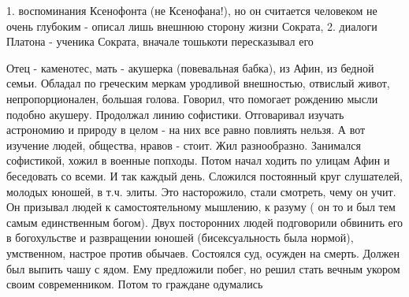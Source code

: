 	1. воспоминания Ксенофонта (не Ксенофана!), но он считается человеком не очень глубоким - описал лишь внешнюю сторону жизни Сократа,
	2. диалоги Платона - ученика Сократа, вначале тошькоти пересказывал его

Отец - каменотес, мать - акушерка (повевальная бабка), из Афин, из бедной семьи. Обладал по греческим меркам уродливой внешностью, отвислый живот, непропорционален, большая голова. 
Говорил, что помогает рождению мысли подобно акушеру. Продолжал линию софистики. Отговаривал изучать астрономию и природу в целом - на них все равно повлиять нельзя. А вот изучение людей, общества, нравов - стоит.
Жил разнообразно. Занимался софистикой, хожил в военные попходы. Потом начал ходить по улицам Афин и беседовать со всеми. И так каждый день. 
Сложился постоянный круг слушателей, молодых юношей, в т.ч. элиты. Это насторожило, стали смотреть, чему он учит. 
Он призывал людей к самостоятельному мышлению, к разуму ( он то и был тем самым единственным богом). 
Двух посторонних людей подговорили обвинить его в богохульстве и развращении юношей (бисексуальность была нормой), умственном, настрое против обычаев. 
Состоялся суд, осужден на смерть. Должен был выпить чашу с ядом. Ему предложили побег, но решил стать вечным укором своим современником. Потом то граждане одумались
